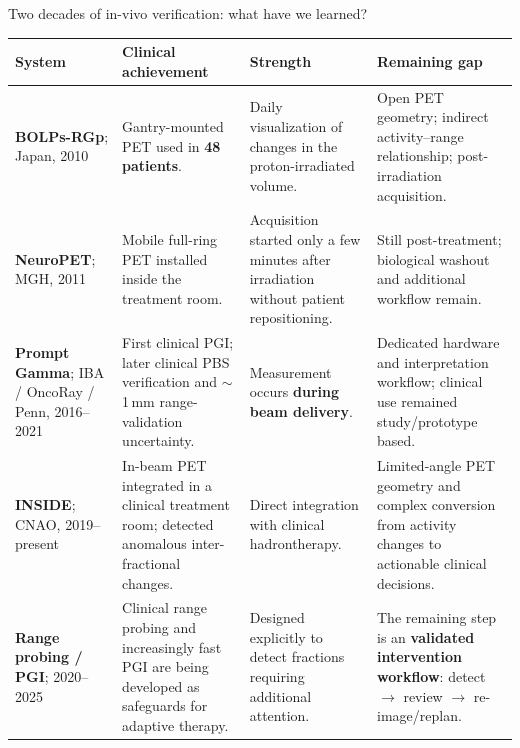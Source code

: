 \documentclass[aspectratio=169,11pt]{beamer}
\begin{document}
\begin{frame}{Two decades of in-vivo verification: what have we learned?}

\vspace{0.10cm}

\renewcommand{\arraystretch}{1.32}
\setlength{\tabcolsep}{4pt}

\begin{center}
\tiny

\begin{tabular}{@{}p{2.25cm} p{3.25cm} p{3.45cm} p{3.45cm}@{}}
\toprule

\textbf{System} &
\textbf{Clinical achievement} &
\textbf{Strength} &
\textbf{Remaining gap} \\

\midrule

\textbf{BOLPs-RGp}; 
Japan, 2010
&
Gantry-mounted PET used in
\textbf{48 patients}.
&
Daily visualization of changes in
the proton-irradiated volume.
&
Open PET geometry; indirect activity--range relationship;
post-irradiation acquisition.
\\\hline

\textbf{NeuroPET};
MGH, 2011
&
Mobile full-ring PET installed
inside the treatment room.
&
Acquisition started only a few minutes
after irradiation without patient repositioning.
&
Still post-treatment; biological washout and
additional workflow remain.
\\\hline

\textbf{Prompt Gamma};
IBA / OncoRay / Penn,
2016--2021
&
First clinical PGI; later clinical PBS verification
and $\sim$1\,mm range-validation uncertainty.
&
Measurement occurs
\textbf{during beam delivery}.
&
Dedicated hardware and interpretation workflow;
clinical use remained study/prototype based.
\\\hline

\textbf{INSIDE};
CNAO, 2019--present
&
In-beam PET integrated in a clinical treatment room;
detected anomalous inter-fractional changes.
&
Direct integration with clinical hadrontherapy.
&
Limited-angle PET geometry and complex conversion
from activity changes to actionable clinical decisions.
\\\hline

\textbf{Range probing / PGI};
2020--2025
&
Clinical range probing and increasingly fast PGI
are being developed as safeguards for adaptive therapy.
&
Designed explicitly to detect fractions
requiring additional attention.
&
The remaining step is an
\textbf{validated intervention workflow}:
detect $\rightarrow$ review $\rightarrow$ re-image/replan.
\\\hline


\end{tabular}
\end{center}
\end{frame}
\end{document}
